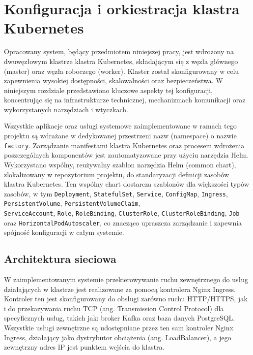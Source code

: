 \section{Konfiguracja i orkiestracja klastra Kubernetes}
\label{chap:konfiguracja_kubernetes}

Opracowany system, będący przedmiotem niniejszej pracy, jest wdrożony na dwuwęzłowym klastrze klastra Kubernetes, składającym się z węzła głównego (master) oraz węzła roboczego (worker). Klaster został skonfigurowany w celu zapewnienia wysokiej dostępności, skalowalności oraz bezpieczeństwa. W niniejszym rozdziale przedstawiono kluczowe aspekty tej konfiguracji, koncentrując się na infrastrukturze technicznej, mechanizmach komunikacji oraz wykorzystanych narzędziach i wtyczkach.

Wszystkie aplikacje oraz usługi systemowe zaimplementowane w ramach tego projektu są wdrażane w dedykowanej przestrzeni nazw (namespace) o nazwie \texttt{factory}. Zarządzanie manifestami klastra Kubernetes oraz procesem wdrożenia poszczególnych komponentów jest zautomatyzowane przy użyciu narzędzia Helm. Wykorzystano wspólny, reużywalny szablon narzędzia Helm (common chart), zlokalizowany w repozytorium projektu, do standaryzacji definicji zasobów klastra Kubernetes. Ten wspólny chart dostarcza szablonów dla większości typów zasobów, w tym \texttt{Deployment}, \texttt{StatefulSet}, \texttt{Service}, \texttt{ConfigMap}, \texttt{Ingress}, \texttt{PersistentVolume}, \texttt{PersistentVolumeClaim}, \\ \texttt{ServiceAccount}, \texttt{Role}, \texttt{RoleBinding}, \texttt{ClusterRole},  \texttt{ClusterRoleBinding}, \texttt{Job} \\ oraz \texttt{HorizontalPodAutoscaler}, co znacząco upraszcza zarządzanie i zapewnia spójność konfiguracji w całym systemie.

\subsection{Architektura sieciowa}

W zaimplementowanym systemie przekierowywanie ruchu zewnętrznego do usług działających w klastrze jest realizowane za pomocą kontrolera Nginx Ingress. Kontroler ten jest skonfigurowany do obsługi zarówno ruchu HTTP/HTTPS, jak i do przekazywania ruchu TCP (ang. Transmission Control Protocol) \cite{tanenbaum2011computer} dla specyficznych usług, takich jak: broker Kafka oraz baza danych PostgreSQL. Wszystkie usługi zewnętrzne są udostępniane przez ten sam kontroler Nginx Ingress, działający jako dystrybutor obciążenia (ang. LoadBalancer), a jego zewnętrzny adres IP jest punktem wejścia do klastra.

